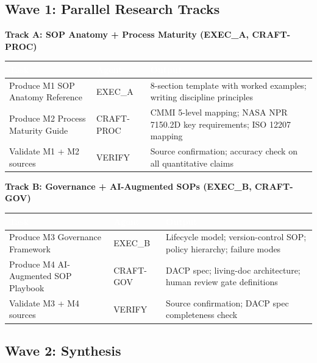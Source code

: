 \documentclass[11pt,letterpaper]{article}
\newcommand{\tableheader}[1]{\textbf{\sffamily\textcolor{white}{#1}}}
\begin{document}
\subsection{Wave 1: Parallel Research Tracks}

\textbf{Track A: SOP Anatomy + Process Maturity (EXEC\_A, CRAFT-PROC)}

\begin{center}
\begin{tabularx}{\textwidth}{L{4cm}L{2.5cm}X}
\toprule
{}
\tableheader{Task} & \tableheader{Agent} & \tableheader{Output} \\
\midrule
Produce M1 SOP Anatomy Reference & EXEC\_A & 8-section template with worked examples; writing discipline principles \\
Produce M2 Process Maturity Guide & CRAFT-PROC & CMMI 5-level mapping; NASA NPR 7150.2D key requirements; ISO 12207 mapping \\
Validate M1 + M2 sources & VERIFY & Source confirmation; accuracy check on all quantitative claims \\
\bottomrule
\end{tabularx}
\end{center}

\textbf{Track B: Governance + AI-Augmented SOPs (EXEC\_B, CRAFT-GOV)}

\begin{center}
\begin{tabularx}{\textwidth}{L{4cm}L{2.5cm}X}
\toprule
{}
\tableheader{Task} & \tableheader{Agent} & \tableheader{Output} \\
\midrule
Produce M3 Governance Framework & EXEC\_B & Lifecycle model; version-control SOP; policy hierarchy; failure modes \\
Produce M4 AI-Augmented SOP Playbook & CRAFT-GOV & DACP spec; living-doc architecture; human review gate definitions \\
Validate M3 + M4 sources & VERIFY & Source confirmation; DACP spec completeness check \\
\bottomrule
\end{tabularx}
\end{center}

\subsection{Wave 2: Synthesis}
\end{document}
